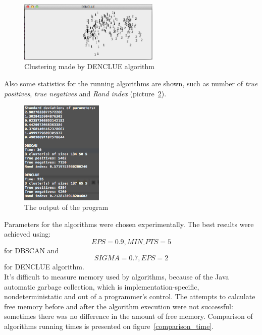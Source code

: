 \documentclass[12pt, a4paper, notitlepage, oneside]{article}
\begin{document}
\begin{figure}[!ht]
 	\centering
	\includegraphics[width=0.6\textwidth]{images/denclue.png}
 	\caption[]
	{Clustering made by DENCLUE algorithm}
		\label{denclue}
	\end{figure}

Also some statistics for the running algorithms are shown, such as number of \textit{true positives}, 
\textit{true negatives} and \textit{Rand index} (picture~\ref{result}).

\begin{figure}[!ht]
 	\centering
	\includegraphics[width=0.35\textwidth]{images/results.png}
 	\caption[]
	{The output of the program}
		\label{result}
\end{figure}

Parameters for the algorithms were chosen experimentally. The best results were achieved using: 
$$EPS = 0.9, MIN\_PTS = 5$$
for DBSCAN and
$$SIGMA = 0.7, EPS = 2$$
for DENCLUE algorithm. \\

It's difficult to measure memory used by algorithms, because of the Java automatic garbage collection, 
which is implementation-specific, nondeterministatic and out of a programmer's control. 
The attempts to calculate free memory before and after the algorithm execution 
were not successful: sometimes there was no difference in the amount of free memory.
Comparison of algorithms running times is presented on figure~\ref{comparison_time}. \\
\end{document}
